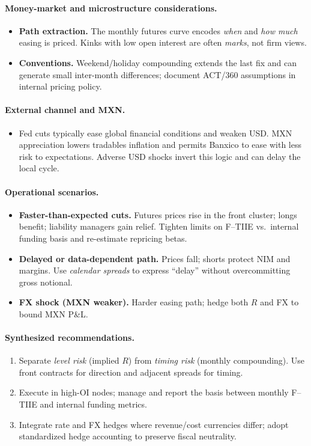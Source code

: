 \documentclass[11pt,a4paper]{article} %
\begin{document}
\paragraph{Money-market and microstructure considerations.}
\begin{itemize}
  \item \textbf{Path extraction.} The monthly futures curve encodes \emph{when} and \emph{how much} easing is priced. Kinks with low open interest are often \emph{marks}, not firm views.
  \item \textbf{Conventions.} Weekend/holiday compounding extends the last fix and can generate small inter-month differences; document ACT/360 assumptions in internal pricing policy.
\end{itemize}

\paragraph{External channel and MXN.}
\begin{itemize}
  \item Fed cuts typically ease global financial conditions and weaken USD. MXN appreciation lowers tradables inflation and permits Banxico to ease with less risk to expectations. Adverse USD shocks invert this logic and can delay the local cycle.
\end{itemize}

\paragraph{Operational scenarios.}
\begin{itemize}
  \item \textbf{Faster-than-expected cuts.} Futures prices rise in the front cluster; longs benefit; liability managers gain relief. Tighten limits on F--TIIE vs.\ internal funding basis and re-estimate repricing betas.
  \item \textbf{Delayed or data-dependent path.} Prices fall; shorts protect NIM and margins. Use \emph{calendar spreads} to express “delay” without overcommitting gross notional.
  \item \textbf{FX shock (MXN weaker).} Harder easing path; hedge both $R$ and FX to bound MXN P\&L.
\end{itemize}

\paragraph{Synthesized recommendations.}
\begin{enumerate}
  \item Separate \emph{level risk} (implied $R$) from \emph{timing risk} (monthly compounding). Use front contracts for direction and adjacent spreads for timing.
  \item Execute in high-OI nodes; manage and report the basis between monthly F--TIIE and internal funding metrics.
  \item Integrate rate and FX hedges where revenue/cost currencies differ; adopt standardized hedge accounting to preserve fiscal neutrality.
\end{enumerate}
\end{document}
